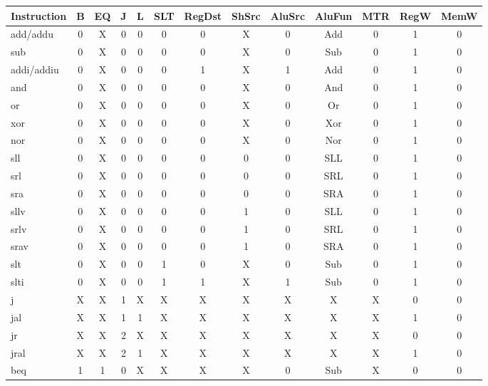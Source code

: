 \begin{table}[ht]
    \begin{tabular}{|l|c|c|c|c|c|c|c|c|c|c|c|c|}
        \hline
        Instruction & B & EQ & J & L & SLT & RegDst & ShSrc & AluSrc & AluFun & MTR & RegW & MemW \\
        \hline
        add/addu   & 0 & X & 0 & 0 & 0 & 0 & X & 0 & Add & 0 & 1 & 0 \\
        sub        & 0 & X & 0 & 0 & 0 & 0 & X & 0 & Sub & 0 & 1 & 0 \\
        addi/addiu & 0 & X & 0 & 0 & 0 & 1 & X & 1 & Add & 0 & 1 & 0 \\
        \hline
        and        & 0 & X & 0 & 0 & 0 & 0 & X & 0 & And & 0 & 1 & 0 \\
        or         & 0 & X & 0 & 0 & 0 & 0 & X & 0 & Or  & 0 & 1 & 0 \\
        xor        & 0 & X & 0 & 0 & 0 & 0 & X & 0 & Xor & 0 & 1 & 0 \\
        nor        & 0 & X & 0 & 0 & 0 & 0 & X & 0 & Nor & 0 & 1 & 0 \\
        \hline
        sll        & 0 & X & 0 & 0 & 0 & 0 & 0 & 0 & SLL & 0 & 1 & 0 \\
        srl        & 0 & X & 0 & 0 & 0 & 0 & 0 & 0 & SRL & 0 & 1 & 0 \\
        sra        & 0 & X & 0 & 0 & 0 & 0 & 0 & 0 & SRA & 0 & 1 & 0 \\
        sllv       & 0 & X & 0 & 0 & 0 & 0 & 1 & 0 & SLL & 0 & 1 & 0 \\
        srlv       & 0 & X & 0 & 0 & 0 & 0 & 1 & 0 & SRL & 0 & 1 & 0 \\
        srav       & 0 & X & 0 & 0 & 0 & 0 & 1 & 0 & SRA & 0 & 1 & 0 \\
        \hline
        slt        & 0 & X & 0 & 0 & 1 & 0 & X & 0 & Sub & 0 & 1 & 0 \\
        slti       & 0 & X & 0 & 0 & 1 & 1 & X & 1 & Sub & 0 & 1 & 0 \\
        \hline
        j          & X & X & 1 & X & X & X & X & X & X   & X & 0 & 0 \\
        jal        & X & X & 1 & 1 & X & X & X & X & X   & X & 1 & 0 \\
        jr         & X & X & 2 & X & X & X & X & X & X   & X & 0 & 0 \\
        jral       & X & X & 2 & 1 & X & X & X & X & X   & X & 1 & 0 \\
        \hline
        beq        & 1 & 1 & 0 & X & X & X & X & 0 & Sub & X & 0 & 0 \\

\end{tabular}
\end{table}
